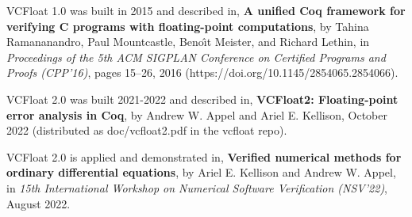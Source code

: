 \documentclass[article]{memoir}
\begin{document}
\quad VCFloat 1.0 was built in 2015 and described in,\newline
\textbf{A unified Coq framework for verifying C programs with floating-point computations}, by Tahina Ramananandro, Paul Mountcastle, Beno\^{\i}t  Meister, and Richard Lethin, in \emph{Proceedings of the 5th ACM SIGPLAN Conference on Certified Programs and Proofs (CPP'16)}, pages 15--26, 2016 (https://doi.org/10.1145/2854065.2854066).
\vspace\baselineskip

VCFloat 2.0 was built 2021-2022 and described in,\newline
\textbf{VCFloat2: Floating-point error analysis in Coq},
by Andrew W. Appel and Ariel E. Kellison,
October 2022  (distributed as doc/vcfloat2.pdf in the vcfloat repo).
\vspace\baselineskip

VCFloat 2.0 is applied and demonstrated in,\newline
\textbf{Verified numerical methods for ordinary differential equations},
by Ariel E. Kellison and Andrew W. Appel,
in \emph{15th International Workshop on Numerical Software Verification (NSV'22)}, August 2022.
\end{document}
